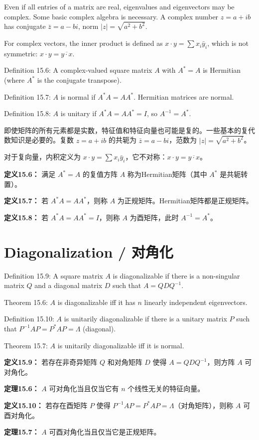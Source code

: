 \begin{original}
Even if all entries of a matrix are real, eigenvalues and eigenvectors may be complex. Some basic complex algebra is necessary. A complex number $z = a + ib$ has conjugate $\bar{z} = a - bi$, norm $|z| = \sqrt{a^2 + b^2}$.

For complex vectors, the inner product is defined as $x \cdot y = \sum x_i \bar{y}_i$, which is not symmetric: $x \cdot y = \overline{y \cdot x}$.

Definition 15.6: A complex-valued square matrix $A$ with $A^* = A$ is Hermitian (where $A^*$ is the conjugate transpose).

Definition 15.7: $A$ is normal if $A^*A = AA^*$. Hermitian matrices are normal.

Definition 15.8: $A$ is unitary if $A^*A = AA^* = I$, so $A^{-1} = A^*$.
\end{original}
\begin{translation}
即使矩阵的所有元素都是实数，特征值和特征向量也可能是复的。一些基本的复代数知识是必要的。复数 $z = a + ib$ 的共轭为 $\bar{z} = a - bi$，范数为 $|z| = \sqrt{a^2 + b^2}$。

对于复向量，内积定义为 $x \cdot y = \sum x_i \bar{y}_i$，它不对称：$x \cdot y = \overline{y \cdot x}$。

\textbf{定义15.6：} 满足 $A^* = A$ 的复值方阵 $A$ 称为Hermitian矩阵（其中 $A^*$ 是共轭转置）。

\textbf{定义15.7：} 若 $A^*A = AA^*$，则称 $A$ 为正规矩阵。Hermitian矩阵都是正规矩阵。

\textbf{定义15.8：} 若 $A^*A = AA^* = I$，则称 $A$ 为酉矩阵，此时 $A^{-1} = A^*$。
\end{translation}

\section{Diagonalization / 对角化}

\begin{original}
Definition 15.9: A square matrix $A$ is diagonalizable if there is a non-singular matrix $Q$ and a diagonal matrix $D$ such that $A = QDQ^{-1}$.

Theorem 15.6: $A$ is diagonalizable iff it has $n$ linearly independent eigenvectors.

Definition 15.10: $A$ is unitarily diagonalizable if there is a unitary matrix $P$ such that $P^{-1}AP = P^*AP = \Lambda$ (diagonal).

Theorem 15.7: $A$ is unitarily diagonalizable iff it is normal.
\end{original}
\begin{translation}
\textbf{定义15.9：} 若存在非奇异矩阵 $Q$ 和对角矩阵 $D$ 使得 $A = QDQ^{-1}$，则方阵 $A$ 可对角化。

\textbf{定理15.6：} $A$ 可对角化当且仅当它有 $n$ 个线性无关的特征向量。

\textbf{定义15.10：} 若存在酉矩阵 $P$ 使得 $P^{-1}AP = P^*AP = \Lambda$（对角矩阵），则称 $A$ 可酉对角化。

\textbf{定理15.7：} $A$ 可酉对角化当且仅当它是正规矩阵。
\end{translation}

